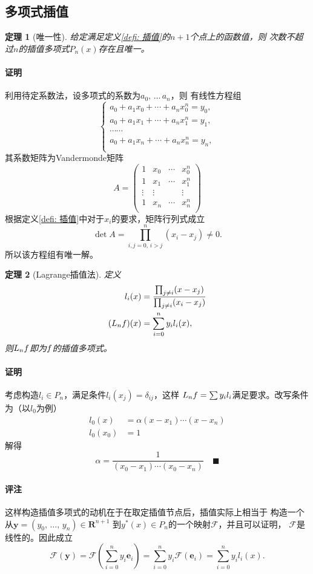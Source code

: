 \documentclass[12pt, a4paper]{article}
\theoremstyle{margin}
\newtheorem{thm}{定理}
\newcommand{\ms}{\mathscr}
\newcommand{\mbf}{\mathbf}
\newcommand{\f}{\mathnormal{f}}
\newcommand{\R}{\mathbf{R}}
\newcommand\defref[1]{定义\ref{#1}}
\newcommand{\remark}{\paragraph{评注}}
\newcommand{\proof}{\paragraph{证明}}
\begin{document}
\subsection{多项式插值}
  \begin{thm}[唯一性]
    给定满足\defref{defi: 插值}的$n+1$个点上的函数值，则
    次数不超过$n$的插值多项式$P_n(x)$存在且唯一。
  \end{thm}
  \proof
    利用待定系数法，设多项式的系数为$a_0,\,\dots\,a_n$，则
    有线性方程组
    \[
      \left\{
      \begin{gathered}
          a_0 + a_1x_0 + \cdots + a_nx_0^n = y_0,\\
          a_0 + a_1x_1 + \cdots + a_nx_1^n = y_1,\\
          \cdots\cdots \\
          a_0 + a_1x_n + \cdots + a_nx_n^n = y_n,\\
      \end{gathered}
      \right.
    \]
    其系数矩阵为Vandermonde矩阵
    \[
      A =
      \begin{pmatrix}
        1 & x_0 & \cdots & x_0^n \\
        1 & x_1 & \cdots & x_1^n \\
        \vdots & \vdots & & \vdots \\
        1 & x_n & \cdots & x_n^n \\
      \end{pmatrix}
    \]
    根据\defref{defi: 插值}中对于$x_i$的要求，矩阵行列式成立
    \[
      \det A = \prod_{i,j=0,\,i>j}^n (x_i - x_j) \ne 0.
    \]
    所以该方程组有唯一解。

  \begin{thm}[Lagrange插值法]
    \label{thm: Lagrange插值法}
    定义
    \[\begin{split}
      l_i(x) &= \frac{\prod_{j\ne i}(x - x_j)}{\prod_{j\ne i}(x_i - x_j)} \\
      (L_n\f)(x) &= \sum_{i=0}^ny_il_i(x),
    \end{split}\]
    则$L_n\f$即为$\f$的插值多项式。
  \end{thm}
  \proof
    考虑构造$l_i\in P_n$，满足条件$l_i(x_j) = \delta_{ij}$，这样
    $L_n\f=\sum y_il_i$满足要求。改写条件为（以$l_0$为例）
    \[\begin{split}
      l_0(x) &= \alpha(x-x_1)\cdots(x-x_n) \\
      l_0(x_0) &= 1
    \end{split}\]
    解得
    \[
      \alpha = \frac{1}{(x_0-x_1)\cdots(x_0-x_n)}\quad\blacksquare
    \]
  \remark
    这样构造插值多项式的动机在于在取定插值节点后，插值实际上相当于
    构造一个从$\mbf{y}=(y_0,\,\dots,\,y_n)\in\R^{n+1}$
    到$y^*(x)\in P_n$的一个映射$\ms{F}$，并且可以证明，
    $\ms{F}$是线性的。因此成立
    \[
      \ms{F}(\mbf{y}) = \ms{F}(\sum_{i=0}^ny_i\mbf{e}_i)
       = \sum_{i=0}^ny_i\ms{F}(\mbf{e}_i)
       = \sum_{i=0}^ny_i l_i(x).
    \]
\end{document}
